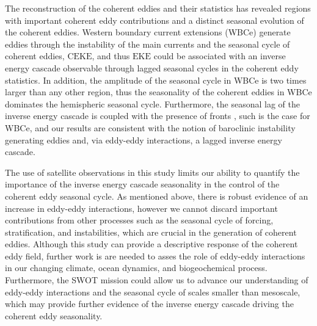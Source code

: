 \documentclass[draft,linenumbers]{agujournal2019}
\newcommand{\EKE}{\textrm{EKE}}
\newcommand{\CEKE}{\textrm{CEKE}}
\begin{document}
	The reconstruction of the coherent eddies and their statistics has revealed regions with important coherent eddy contributions and a distinct seasonal evolution of the coherent eddies. 
	Western boundary current extensions (WBCe) generate eddies through the instability of the main currents and the seasonal cycle of coherent eddies, $\CEKE$, and thus $\EKE$ could be associated with an inverse energy cascade observable through lagged seasonal cycles in the coherent eddy statistics. 
	In addition, the amplitude of the seasonal cycle in WBCe is two times larger than any other region, thus the seasonality of the coherent eddies in WBCe dominates the hemispheric seasonal cycle. 
	Furthermore, the seasonal lag of the inverse energy cascade is coupled with the presence of fronts \citep{Qiu_seasonal_2014}, such is the case for WBCe, and our results are consistent with the notion of baroclinic instability generating eddies and, via eddy-eddy interactions, a lagged inverse energy cascade.
	
	The use of satellite observations in this study limits our ability to quantify the importance of the inverse energy cascade seasonality in the control of the coherent eddy seasonal cycle. 
	As mentioned above, there is robust evidence of an increase in eddy-eddy interactions, however we cannot discard important contributions from other processes such as the seasonal cycle of forcing, stratification, and instabilities, which are crucial in the generation of coherent eddies. Although this study can provide a descriptive response of the coherent eddy field, further work is are needed to asses the role of eddy-eddy interactions in our changing climate, ocean dynamics, and biogeochemical process. Furthermore, the SWOT mission could allow us to advance our understanding of eddy-eddy interactions and the seasonal cycle of scales smaller than mesoscale, which may provide further evidence of the inverse energy cascade driving the coherent eddy seasonality.
\end{document}
